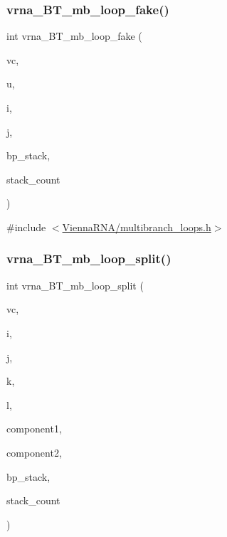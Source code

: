 \subsubsection{\texorpdfstring{vrna\+\_\+\+B\+T\+\_\+mb\+\_\+loop\+\_\+fake()}{vrna\_BT\_mb\_loop\_fake()}}
{\footnotesize\ttfamily int vrna\+\_\+\+B\+T\+\_\+mb\+\_\+loop\+\_\+fake (\begin{DoxyParamCaption}\item[{\mbox{\hyperlink{group__fold__compound_ga1b0cef17fd40466cef5968eaeeff6166}{vrna\+\_\+fold\+\_\+compound\+\_\+t}} $\ast$}]{vc,  }\item[{int $\ast$}]{u,  }\item[{int $\ast$}]{i,  }\item[{int $\ast$}]{j,  }\item[{\mbox{\hyperlink{group__data__structures_gaa651bda42e7692f08cb603cd6834b0ee}{vrna\+\_\+bp\+\_\+stack\+\_\+t}} $\ast$}]{bp\+\_\+stack,  }\item[{int $\ast$}]{stack\+\_\+count }\end{DoxyParamCaption})}



{\ttfamily \#include $<$\mbox{\hyperlink{multibranch__loops_8h}{Vienna\+R\+N\+A/multibranch\+\_\+loops.\+h}}$>$}

\mbox{\label{group__loops_ga08245ee149f137d6665ef2bdfcc066a7}} 
\subsubsection{\texorpdfstring{vrna\+\_\+\+B\+T\+\_\+mb\+\_\+loop\+\_\+split()}{vrna\_BT\_mb\_loop\_split()}}
{\footnotesize\ttfamily int vrna\+\_\+\+B\+T\+\_\+mb\+\_\+loop\+\_\+split (\begin{DoxyParamCaption}\item[{\mbox{\hyperlink{group__fold__compound_ga1b0cef17fd40466cef5968eaeeff6166}{vrna\+\_\+fold\+\_\+compound\+\_\+t}} $\ast$}]{vc,  }\item[{int $\ast$}]{i,  }\item[{int $\ast$}]{j,  }\item[{int $\ast$}]{k,  }\item[{int $\ast$}]{l,  }\item[{int $\ast$}]{component1,  }\item[{int $\ast$}]{component2,  }\item[{\mbox{\hyperlink{group__data__structures_gaa651bda42e7692f08cb603cd6834b0ee}{vrna\+\_\+bp\+\_\+stack\+\_\+t}} $\ast$}]{bp\+\_\+stack,  }\item[{int $\ast$}]{stack\+\_\+count }\end{DoxyParamCaption})}



